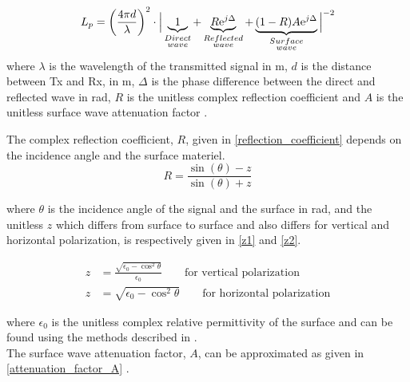 \begin{equation}
L_p=\left(\frac{4 \pi d}{\lambda}\right)^2 \cdot \Big|\underbrace{1}_{\begin{subarray}{c}Direct\\wave\end{subarray}}+\underbrace{R\text{e}^{j\Delta}}_{\begin{subarray}{c}Reflected\\wave\end{subarray}}+\underbrace{(1-R)A\text{e}^{j\Delta}}_{\begin{subarray}{c}Surface\\wave\end{subarray}}\Big|^{-2} 
\label{ground_wave}
\end{equation}
where
$\lambda$ is the wavelength of the transmitted signal in m, $d$ is the distance between Tx and Rx, in m, $\Delta$ is the phase difference between the direct and reflected wave in rad, $R$ is the unitless complex reflection coefficient and $A$ is the unitless surface wave attenuation factor \cite{Chong,Bullington}. 


The complex reflection coefficient, $R$, given in \eqref{reflection_coefficient} depends on the incidence angle and the surface materiel.
\begin{equation}
R = \frac{\sin(\theta)-z}{\sin(\theta)+z}
\label{reflection_coefficient}
\end{equation}

where $\theta$ is the incidence angle of the signal and the surface in rad, and the unitless $z$ which differs from surface to surface and also differs for vertical and horizontal polarization, is respectively given in \eqref{z1} and \eqref{z2}.

\begin{align}
z &= \frac{\sqrt{\epsilon_{0}-\cos^{2}\theta}}{\epsilon_{0}} \qquad \text{for vertical polarization} \label{z1}\\
z &= \sqrt{\epsilon_{0}-\cos^{2}\theta}  \qquad \text{for horizontal polarization}
\label{z2}
\end{align}

where $\epsilon_{0}$ is the unitless complex relative permittivity of the surface and can be found using the methods described in \cite{Kim}.\\
The surface wave attenuation factor, $A$, can be approximated as given in \eqref{attenuation_factor_A} \cite{Chong, Bullington}. 


